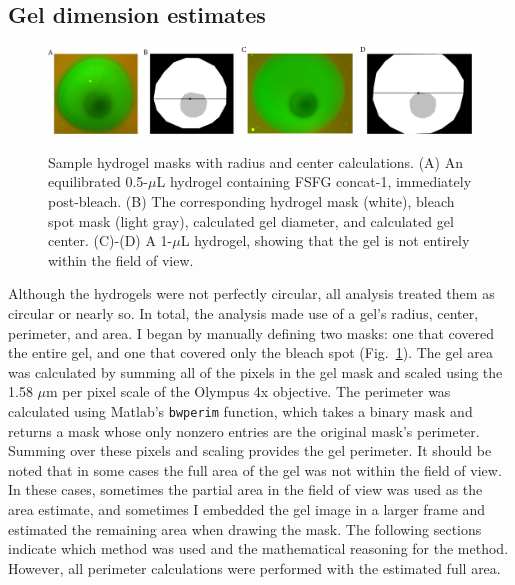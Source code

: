 \subsection{Gel dimension estimates}
\label{sec:gel-dim}

\begin{figure} 
\caption[Hydrogel masks with radius and center calculations.]{Sample hydrogel masks with radius and center calculations.  (A) An equilibrated 0.5-$\mu$L hydrogel containing FSFG concat-1, immediately post-bleach. (B) The corresponding hydrogel mask (white), bleach spot mask (light gray), calculated gel diameter, and calculated gel center. (C)-(D) A 1-$\mu$L hydrogel, showing that the gel is not entirely within the field of view.}
\centering
\includegraphics[width=\textwidth]{figs/ch04/geometry.pdf}
\label{fig:masks}
\end{figure} 

Although the hydrogels were not perfectly circular, all analysis treated them as circular or nearly so.  In total, the analysis made use of a gel's radius, center, perimeter, and area.  I began by manually defining two masks: one that covered the entire gel, and one that covered only the bleach spot (Fig.~\ref{fig:masks}).  The gel area was calculated by summing all of the pixels in the gel mask and scaled using the 1.58 $\mu$m per pixel scale of the Olympus 4x objective.  The perimeter was calculated using Matlab's \texttt{bwperim} function, which takes a binary mask and returns a mask whose only nonzero entries are the original mask's perimeter.  Summing over these pixels and scaling provides the gel perimeter.  It should be noted that in some cases the full area of the gel was not within the field of view.  In these cases, sometimes the partial area in the field of view was used as the area estimate, and sometimes I embedded the gel image in a larger frame and estimated the remaining area when drawing the mask.  The following sections indicate which method was used and the mathematical reasoning for the method.  However, all perimeter calculations were performed with the estimated full area.

